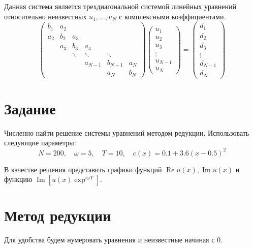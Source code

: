 \documentclass[12pt]{article}
\begin{document}
Данная система является трехдиагональной системой линейных уравнений
относительно неизвестных $u_1, \dots, u_N$ с комплексными коэффициентами.
\[
\begin{pmatrix}
b_1 & a_2 \\
a_2 & b_2 & a_3 \\
& a_3 & b_3 & a_4 \\
&& \ddots & \ddots & \ddots\\
&&& a_{N-1} & b_{N-1} & a_N\\
&&&& a_N & b_N
\end{pmatrix}
\begin{pmatrix}
u_1\\u_2\\u_3\\\vdots\\u_{N-1}\\u_N
\end{pmatrix} = 
\begin{pmatrix}
d_1\\d_2\\d_3\\\vdots\\d_{N-1}\\d_N
\end{pmatrix}
\]

\section{Задание}

Численно найти решение системы уравнений методом редукции.
Использовать следующие параметры: 
\[N = 200,\quad \omega = 5,\quad T = 10,\quad c(x) = 0.1 + 3.6 (x - 0.5)^2\]

В качестве решения представить графики функций $\operatorname{Re} u(x), \operatorname{Im}
u(x)$ и функцию $\operatorname{Im}\left[u(x) \exp^{i\omega T}\right]$.

\section{Метод редукции}

Для удобства будем нумеровать уравнения и неизвестные начиная с 0.
\end{document}
